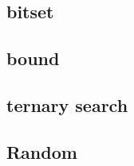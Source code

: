 \documentclass[a4paper,twocolumn]{extarticle}
\begin{document}
{        \subsection{bitset}
        
        \subsection{bound}
        
        
        \subsection{ternary search}
        
        \subsection{Random}
        
    }
    \newpage
\end{document}
